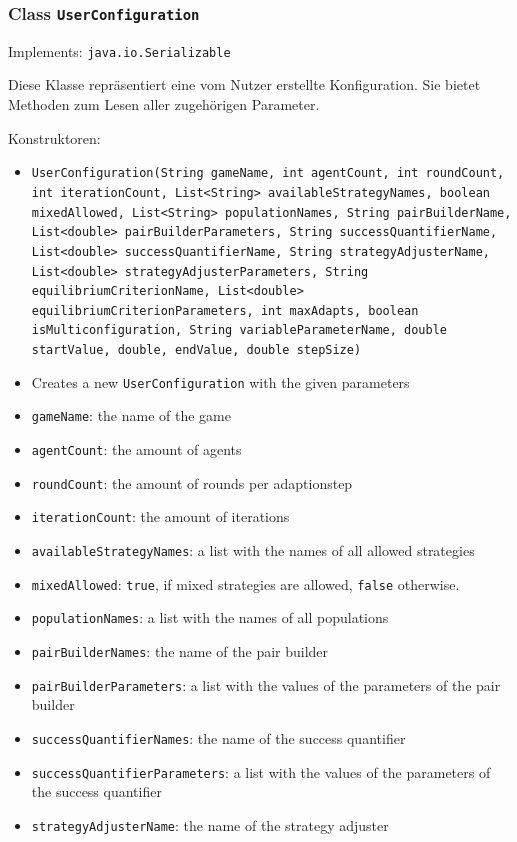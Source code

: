 \documentclass[parskip=full,11pt]{scrartcl}
\begin{document}
\subsubsection{Class \texttt{UserConfiguration}}
Implements: \texttt{java.io.Serializable}

Diese Klasse repräsentiert eine vom Nutzer erstellte Konfiguration. Sie bietet Methoden zum Lesen aller zugehörigen Parameter.

Konstruktoren:
\begin{itemize}\itemsep -10pt
\item \texttt{UserConfiguration(String gameName, int agentCount, int roundCount, int iterationCount, List<String> availableStrategyNames, boolean mixedAllowed, List<String> populationNames, String pairBuilderName, List<double> pairBuilderParameters, String successQuantifierName, List<double> successQuantifierName, String strategyAdjusterName, List<double> strategyAdjusterParameters, String equilibriumCriterionName, List<double> equilibriumCriterionParameters, int maxAdapts, boolean isMulticonfiguration, String variableParameterName, double startValue, double, endValue, double stepSize)}
\item[] Creates a new \texttt{UserConfiguration} with the given parameters
\item[] \texttt{gameName}: the name of the game
\item[] \texttt{agentCount}: the amount of agents
\item[] \texttt{roundCount}: the amount of rounds per adaptionstep
\item[] \texttt{iterationCount}: the amount of iterations
\item[] \texttt{availableStrategyNames}: a list with the names of all allowed strategies
\item[] \texttt{mixedAllowed}: \texttt{true}, if mixed strategies are allowed, \texttt{false} otherwise.
\item[] \texttt{populationNames}: a list with the names of all populations
\item[] \texttt{pairBuilderNames}: the name of the pair builder
\item[] \texttt{pairBuilderParameters}: a list with the values of the parameters of the pair builder
\item[] \texttt{successQuantifierNames}: the name of the success quantifier
\item[] \texttt{successQuantifierParameters}: a list with the values of the parameters of the success quantifier
\item[] \texttt{strategyAdjusterName}: the name of the strategy adjuster

\end{itemize}
\end{document}

